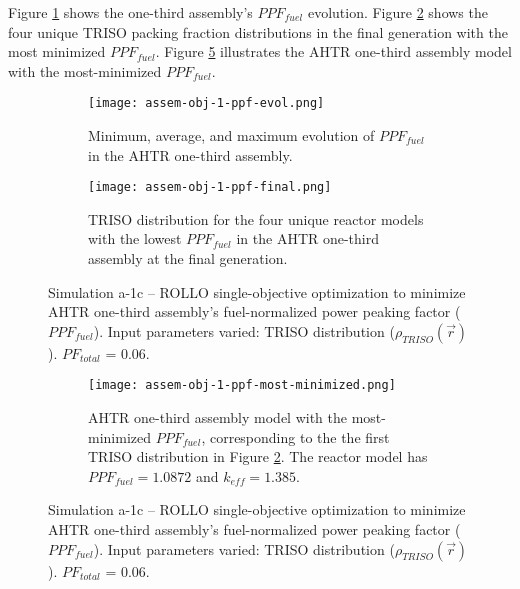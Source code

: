 Figure \ref{fig:assem-obj-1-ppf-evol} shows the one-third assembly's $PPF_{fuel}$ 
evolution. 
Figure \ref{fig:assem-obj-1-ppf-final} shows the four unique TRISO packing fraction 
distributions in the final generation with the most minimized $PPF_{fuel}$. 
Figure \ref{fig:assem-obj-1-ppf-most-minimized} illustrates the \gls{AHTR} one-third 
assembly model with the most-minimized $PPF_{fuel}$. 
\begin{figure}[htbp!]
    \begin{subfigure}{\textwidth}
        \centering
        \texttt{[image: assem-obj-1-ppf-evol.png]}
        \caption{Minimum, average, and maximum evolution of $PPF_{fuel}$ in the 
        AHTR one-third assembly.}
        \label{fig:assem-obj-1-ppf-evol} 
    \end{subfigure}
    \begin{subfigure}{\textwidth}
        \centering
        \texttt{[image: assem-obj-1-ppf-final.png]}
        \caption{TRISO distribution for the four unique reactor models with the 
        lowest $PPF_{fuel}$ in the AHTR one-third assembly at the final generation.}
        \label{fig:assem-obj-1-ppf-final} 
    \end{subfigure}
    \caption{Simulation a-1c -- ROLLO single-objective optimization to minimize 
    AHTR one-third assembly's fuel-normalized power peaking factor ($PPF_{fuel}$). 
    Input parameters varied: TRISO distribution ($\rho_{TRISO}(\vec{r})$).
    $PF_{total}$ = 0.06.}
    \label{fig:assem-obj-1-ppf}
\end{figure}
\begin{figure}[htbp!]
    \ContinuedFloat
    \begin{subfigure}{\textwidth}
        \centering
        \texttt{[image: assem-obj-1-ppf-most-minimized.png]}
        \caption{\gls{AHTR} one-third assembly model with the most-minimized 
        $PPF_{fuel}$, corresponding to the the first TRISO distribution in Figure 
        \ref{fig:assem-obj-1-ppf-final}. The reactor model has $PPF_{fuel}=1.0872$
        and $k_{eff}=1.385$.}
        \label{fig:assem-obj-1-ppf-most-minimized} 
    \end{subfigure}
    \caption{Simulation a-1c -- ROLLO single-objective optimization to minimize 
    AHTR one-third assembly's fuel-normalized power peaking factor ($PPF_{fuel}$). 
    Input parameters varied: TRISO distribution ($\rho_{TRISO}(\vec{r})$).
    $PF_{total}$ = 0.06.}
\end{figure}

